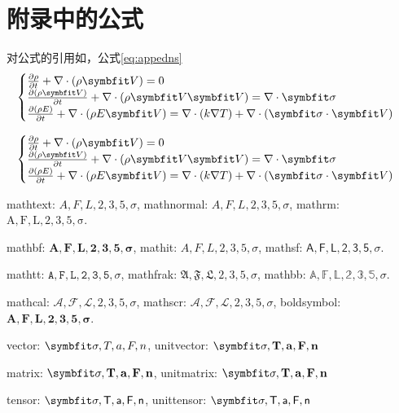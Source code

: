 \thispagestyle{appendixheader}
\setcounter{app_fig}{1}
\setcounter{app_tab}{1}
\setcounter{equation}{0}
\renewcommand\theequation{附\arabic{app}-\arabic{equation}}
\renewcommand\chaptername{附录}
\renewcommand\chaptername{Appendix} 
\renewcommand\thechapter{附录\zhnum{app}} 

\setcounter{chapter}{0}
\setcounter{section}{0}
\chapter{附录中的公式}\label{chap:app1}{

对公式的引用如，公式\eqref{eq:appedns}
\begin{equation} \label{eq:appedns}
    \begin{cases}
        \frac{\partial \rho}{\partial t} + \nabla\cdot(\rho\Vector{V}) = 0\\
        \frac{\partial (\rho\Vector{V})}{\partial t} + \nabla\cdot(\rho\Vector{V}\Vector{V}) = \nabla\cdot\Tensor{\sigma}\\
        \frac{\partial (\rho E)}{\partial t} + \nabla\cdot(\rho E\Vector{V}) = \nabla\cdot(k\nabla T) + \nabla\cdot(\Tensor{\sigma}\cdot\Vector{V})
    \end{cases}
\end{equation}

\begin{equation} \label{eq:appedns2}
    \begin{cases}
        \frac{\partial \rho}{\partial t} + \nabla\cdot(\rho\Vector{V}) = 0\\
        \frac{\partial (\rho\Vector{V})}{\partial t} + \nabla\cdot(\rho\Vector{V}\Vector{V}) = \nabla\cdot\Tensor{\sigma}\\
        \frac{\partial (\rho E)}{\partial t} + \nabla\cdot(\rho E\Vector{V}) = \nabla\cdot(k\nabla T) + \nabla\cdot(\Tensor{\sigma}\cdot\Vector{V})
    \end{cases}
\end{equation}


mathtext: $A,F,L,2,3,5,\sigma$, mathnormal: $A,F,L,2,3,5,\sigma$, mathrm: $\mathrm{A,F,L,2,3,5,\sigma}$.

mathbf: $\mathbf{A,F,L,2,3,5,\sigma}$, mathit: $\mathit{A,F,L,2,3,5,\sigma}$, mathsf: $\mathsf{A,F,L,2,3,5,\sigma}$.

mathtt: $\mathtt{A,F,L,2,3,5,\sigma}$, mathfrak: $\mathfrak{A,F,L,2,3,5,\sigma}$, mathbb: $\mathbb{A,F,L,2,3,5,\sigma}$.

mathcal: $\mathcal{A,F,L,2,3,5,\sigma}$, mathscr: $\mathscr{A,F,L,2,3,5,\sigma}$, boldsymbol: $\boldsymbol{A,F,L,2,3,5,\sigma}$.

vector: $\Vector{\sigma, T, a, F, n}$, unitvector: $\unitVector{\sigma, T, a, F, n}$

matrix: $\Matrix{\sigma, T, a, F, n}$, unitmatrix: $\unitMatrix{\sigma, T, a, F, n}$

tensor: $\Tensor{\sigma, T, a, F, n}$, unittensor: $\unitTensor{\sigma, T, a, F, n}$ 


\thispagestyle{appendixheader}
}
